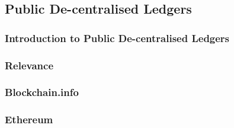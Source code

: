 \subsection{Public De-centralised Ledgers}

\subsubsection{Introduction to Public De-centralised Ledgers}

\subsubsection{Relevance}

\subsubsection{Blockchain.info}

\subsubsection{Ethereum}
